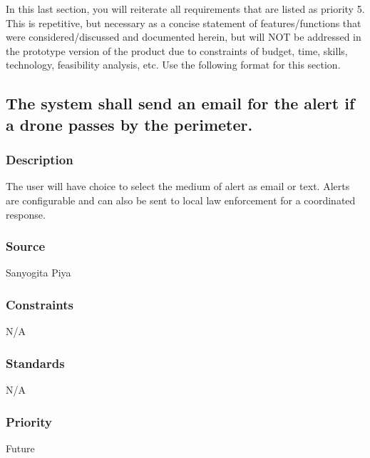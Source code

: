 In this last section, you will reiterate all requirements that are listed as priority 5. This is repetitive, but necessary as a concise statement of features/functions that were considered/discussed and documented herein, but will NOT be addressed in the prototype version of the product due to constraints of budget, time, skills, technology, feasibility analysis, etc. Use the following format for this section.

\subsection{The system shall send an email for the alert if a drone passes by the perimeter.}
\subsubsection{Description}
The user will have choice to select the medium of alert as email or text. Alerts are configurable and can also be sent to local law enforcement for a coordinated response.
\subsubsection{Source}
Sanyogita Piya
\subsubsection{Constraints}
N/A
\subsubsection{Standards}
N/A
\subsubsection{Priority}
Future
